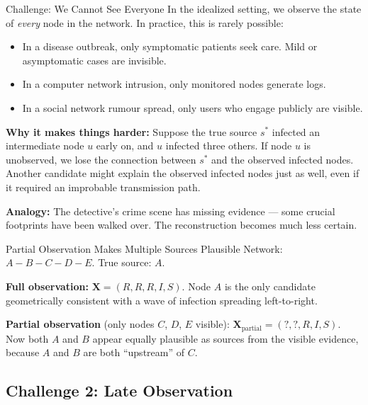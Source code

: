 \begin{conceptbox}{Challenge: We Cannot See Everyone}
In the idealized setting, we observe the state of \emph{every} node in the
network. In practice, this is rarely possible:
\begin{itemize}
    \item In a disease outbreak, only symptomatic patients seek care. Mild or
    asymptomatic cases are invisible.
    \item In a computer network intrusion, only monitored nodes generate logs.
    \item In a social network rumour spread, only users who engage publicly
    are visible.
\end{itemize}
\textbf{Why it makes things harder:} Suppose the true source $s^*$ infected
an intermediate node $u$ early on, and $u$ infected three others. If node
$u$ is unobserved, we lose the connection between $s^*$ and the observed
infected nodes. Another candidate might explain the observed infected nodes
just as well, even if it required an improbable transmission path.

\textbf{Analogy:} The detective's crime scene has missing evidence — some
crucial footprints have been walked over. The reconstruction becomes much
less certain.
\end{conceptbox}

\begin{examplebox}{Partial Observation Makes Multiple Sources Plausible}
Network: $A - B - C - D - E$. True source: $A$.

\textbf{Full observation:} $\mathbf{X} = (R, R, R, I, S)$.
Node $A$ is the only candidate geometrically consistent with a wave of
infection spreading left-to-right.

\textbf{Partial observation} (only nodes $C$, $D$, $E$ visible):
$\mathbf{X}_{\text{partial}} = (?, ?, R, I, S)$.
Now both $A$ and $B$ appear equally plausible as sources from the visible
evidence, because $A$ and $B$ are both ``upstream'' of $C$.
\end{examplebox}

\subsection{Challenge 2: Late Observation}

